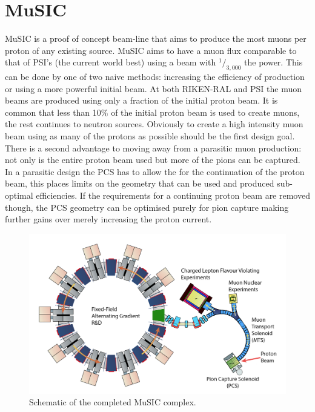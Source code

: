 \section{MuSIC} %
\label{cha:music}
MuSIC is a proof of concept beam-line that aims to produce the most muons per proton of any existing source. MuSIC aims to have a muon flux comparable to that of PSI's (the current world best) using a beam with \(^1/_{3,000}\) the power. This can be done by one of two naive methods: increasing the efficiency of production or using a more powerful initial beam. At both RIKEN-RAL and PSI the muon beams are produced using only a fraction of the initial proton beam. It is common that less than 10\% of the initial proton beam is used to create muons, the rest continues to neutron sources. Obviously to create a high intensity muon beam using as many of the protons as possible should be the first design goal. There is a second advantage to moving away from a parasitic muon production: not only is the entire proton beam used but more of the pions can be captured. In a parasitic design the PCS has to allow the for the continuation of the proton beam, this places limits on the geometry that can be used and produced sub-optimal efficiencies. If the requirements for a continuing proton beam are removed though, the PCS geometry can be optimised purely for pion capture making further gains over merely increasing the proton current.

\begin{figure}[htbp]
  \centering
    \includegraphics[width=.9\textwidth]{images/MuSIC_schematic_FFAG.png}
  \caption{Schematic of the completed MuSIC complex.}
  \label{fig:images_MuSIC_schematic_FFAG}
\end{figure}

